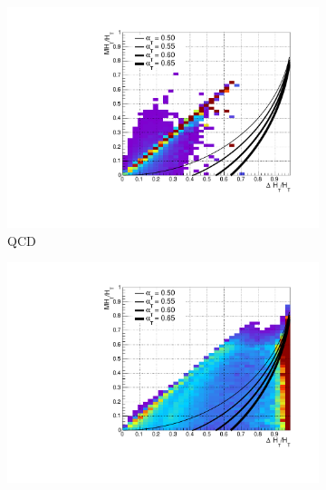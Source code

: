 \begin{figure}[t!]
  \centering
  \begin{subfigure}[t]{.46\textwidth}
    \includegraphics[width=\textwidth]{Figs/alphat/alphat_correlation_QCD.pdf}
    \caption{QCD}
    \label{fig:alphat_corr_qcd}
  \end{subfigure}
  \begin{subfigure}[t]{.46\textwidth}
    \includegraphics[width=\textwidth]{Figs/alphat/alphat_correlation_Zinv.pdf}
    \caption{\zinv}
    \label{fig:alphat_corr_zinv}
  \end{subfigure}\\
  \begin{subfigure}[t]{.46\textwidth}

\end{subfigure}
\end{figure}
